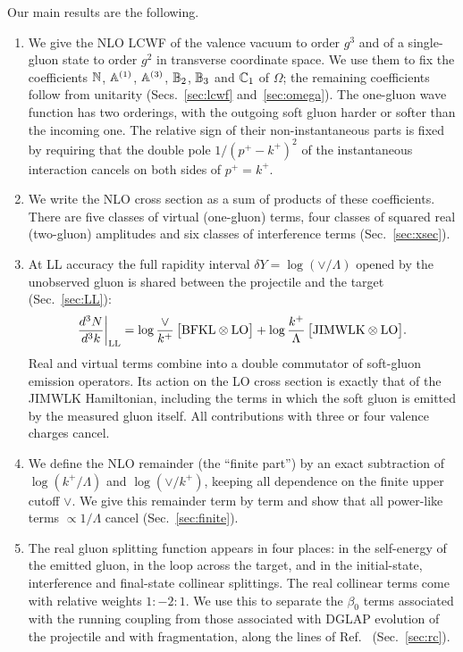Our main results are the following.
\begin{enumerate}
\item We give the NLO LCWF of the valence vacuum to order $g^3$ and of a single-gluon state to order $g^2$ in transverse coordinate space. We use them to fix the coefficients $\mathbb{N}$, $\mathbb{A}^{(1)}$, $\mathbb{A}^{(3)}$, $\mathbb{B}_2$, $\mathbb{B}_3$ and $\mathbb{C}_1$ of $\Omega$; the remaining coefficients follow from unitarity (Secs.~\ref{sec:lcwf} and~\ref{sec:omega}). The one-gluon wave function has two orderings, with the outgoing soft gluon harder or softer than the incoming one. The relative sign of their non-instantaneous parts is fixed by requiring that the double pole $1/(p^+-k^+)^2$ of the instantaneous interaction cancels on both sides of $p^+=k^+$.
\item We write the NLO cross section as a sum of products of these coefficients. There are five classes of virtual (one-gluon) terms, four classes of squared real (two-gluon) amplitudes and six classes of interference terms (Sec.~\ref{sec:xsec}).
\item At LL accuracy the full rapidity interval $\delta Y=\log(\vee/\Lambda)$ opened by the unobserved gluon is shared between the projectile and the target (Sec.~\ref{sec:LL}):
\begin{equation}
\frac{d^3N}{d^3k}\bigg|_{\rm LL}=\log\frac{\vee}{k^+}\,\big[{\rm BFKL}\otimes{\rm LO}\big]+\log\frac{k^+}{\Lambda}\,\big[{\rm JIMWLK}\otimes{\rm LO}\big].
\label{eq:intro-main}
\end{equation}
Real and virtual terms combine into a double commutator of soft-gluon emission operators. Its action on the LO cross section is exactly that of the JIMWLK Hamiltonian, including the terms in which the soft gluon is emitted by the measured gluon itself. All contributions with three or four valence charges cancel.
\item We define the NLO remainder (the ``finite part'') by an exact subtraction of $\log(k^+/\Lambda)$ and $\log(\vee/k^+)$, keeping all dependence on the finite upper cutoff $\vee$. We give this remainder term by term and show that all power-like terms $\propto1/\Lambda$ cancel (Sec.~\ref{sec:finite}).
\item The real gluon splitting function appears in four places: in the self-energy of the emitted gluon, in the loop across the target, and in the initial-state, interference and final-state collinear splittings. The real collinear terms come with relative weights $1:-2:1$. We use this to separate the $\beta_0$ terms associated with the running coupling from those associated with DGLAP evolution of the projectile and with fragmentation, along the lines of Ref.~\cite{Kovner:2023vsy} (Sec.~\ref{sec:rc}).
\end{enumerate}


